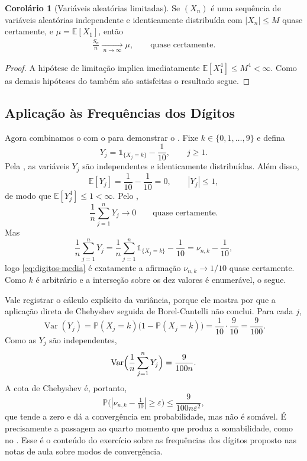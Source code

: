 \documentclass[12pt,portuguese]{article}
\theoremstyle{definition}
\newtheorem{corollary}[corollary]{Corolário}
\theoremstyle{plainexercise}
\theoremstyle{starredexercise}
\theoremstyle{definition}
\begin{document}
\begin{corollary}[Variáveis aleatórias limitadas]\label{cor:limitadas}
Se $(X_n)$ é uma sequência de variáveis aleatórias
independente e identicamente distribuída com $|X_n|\leqslant M$
quase certamente, e $\mu=\mathbb{E}[X_1]$, então
\begin{align*}
\frac{S_n}{n} \xrightarrow[\ n\to\infty \ ] \,  \mu, \qquad \text{quase certamente.}
\end{align*}
\end{corollary}

\begin{proof}
A hipótese de limitação implica imediatamente $\mathbb{E}[X_1^4]\leqslant M^4<\infty$.
Como as demais hipóteses do
 também são satisfeitas o resultado segue.
\end{proof}

\subsection{Aplicação às Frequências dos Dígitos}\label{subsec:digitos-quarta}

Agora combinamos o  com o  para
demonstrar o . Fixe
$k\in\{0,1,\ldots,9\}$ e defina
\[
Y_j=\mathds{1}_{\{X_j=k\}}-\frac{1}{10},
\qquad j\geqslant1.
\]
Pela , as variáveis $Y_j$ são independentes e
identicamente distribuídas. Além disso,
\[
\mathbb{E}[Y_j]=\frac{1}{10}-\frac{1}{10}=0,
\qquad
|Y_j|\leqslant1,
\]
de modo que $\mathbb{E}[Y_j^4]\leqslant1<\infty$. Pelo
,
\begin{equation}\label{eq:digitos-media}
\frac{1}{n}\sum_{j=1}^{n}Y_j
\longrightarrow0
\qquad\text{quase certamente.}
\end{equation}
Mas
\[
\frac{1}{n}\sum_{j=1}^{n}Y_j
=
\frac{1}{n}\sum_{j=1}^{n}\mathds{1}_{\{X_j=k\}}-\frac{1}{10}
=
\nu_{n,k}-\frac{1}{10},
\]
logo \eqref{eq:digitos-media} é exatamente a afirmação
$\nu_{n,k}\to1/10$ quase certamente. Como $k$ é arbitrário e a interseção sobre
os dez valores é enumerável, o  segue.

Vale registrar o cálculo explícito da variância, porque ele mostra por que a
aplicação direta de Chebyshev seguida de Borel-Cantelli não conclui.
Para cada $j$,
\[
\operatorname{Var}(Y_j)
=
\mathbb{P}(X_j=k)\bigl(1-\mathbb{P}(X_j=k)\bigr)
=
\frac{1}{10}\cdot\frac{9}{10}
=
\frac{9}{100}.
\]
Como as $Y_j$ são independentes,
\[
\operatorname{Var}\Bigl(\frac{1}{n}\sum_{j=1}^{n}Y_j\Bigr)
=
\frac{9}{100n}.
\]
A cota de Chebyshev é, portanto,
\[
\mathbb{P}\bigl(|\nu_{n,k}-\tfrac{1}{10}|\geqslant\varepsilon\bigr)
\leqslant
\frac{9}{100n\varepsilon^2},
\]
que tende a zero e dá a convergência em probabilidade, mas não é somável. É
precisamente a passagem ao quarto momento que produz a somabilidade, como no
. Esse é o conteúdo do exercício sobre as frequências
dos dígitos proposto nas notas de aula sobre modos de convergência.
\end{document}
